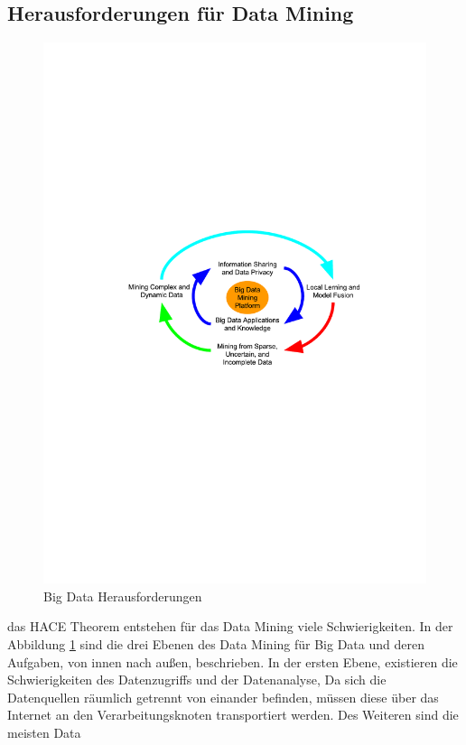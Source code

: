 \documentclass[12pt,journal,compsoc]{IEEEtran}
\begin{document}
\subsection{Herausforderungen für Data Mining}
\begin{figure}[!t]
\centering
\includegraphics[scale=0.65,trim={120 340 100 280},clip]{../beamer/img/bigdata42.pdf}
\caption{Big Data Herausforderungen \cite{wu2014data}}
\label{bigdata}
\end{figure}
 das HACE Theorem entstehen für das Data Mining viele Schwierigkeiten. In der Abbildung \ref{bigdata} 
sind die drei Ebenen des Data Mining für Big Data und deren Aufgaben, von innen nach außen, beschrieben. In der ersten Ebene, 
existieren die Schwierigkeiten des Datenzugriffs und der Datenanalyse, Da sich die Datenquellen räumlich getrennt von einander 
befinden, müssen diese über das Internet an den Verarbeitungsknoten transportiert werden. Des Weiteren sind  die meisten Data 
\end{document}
